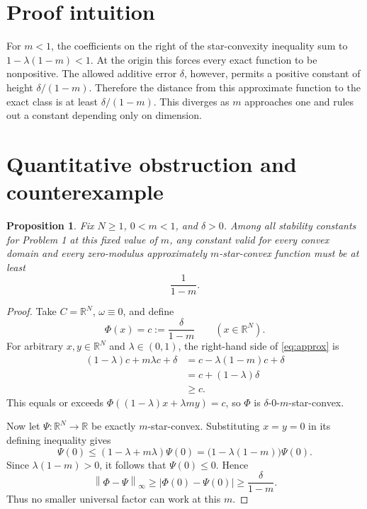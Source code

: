 \documentclass[11pt]{article}
\newcommand{\R}{\mathbb R}
\newcommand{\norm}[1]{\left\lVert#1\right\rVert}
\newtheorem{proposition}{Proposition}
\begin{document}
\section{Proof intuition}

For \(m<1\), the coefficients on the right of the star-convexity inequality
sum to \(1-\lambda(1-m)<1\).  At the origin this forces every exact function
to be nonpositive.  The allowed additive error \(\delta\), however, permits a
positive constant of height \(\delta/(1-m)\).  Therefore the distance from
this approximate function to the exact class is at least
\(\delta/(1-m)\).  This diverges as \(m\) approaches one and rules out a
constant depending only on dimension.

\section{Quantitative obstruction and counterexample}

\begin{proposition}\label{prop:fixedm}
Fix \(N\geq1\), \(0<m<1\), and \(\delta>0\).  Among all stability constants
for Problem 1 at this fixed value of \(m\), any constant valid for every
convex domain and every zero-modulus approximately \(m\)-star-convex function
must be at least
\[
 \frac{1}{1-m}.
\]
\end{proposition}

\begin{proof}
Take \(C=\R^N\), \(\omega\equiv0\), and define
\begin{equation}\label{eq:constant}
 \Phi(x)=c:=\frac{\delta}{1-m}\qquad(x\in\R^N).
\end{equation}
For arbitrary \(x,y\in\R^N\) and \(\lambda\in(0,1)\), the right-hand side
of \eqref{eq:approx} is
\begin{align*}
 (1-\lambda)c+m\lambda c+\delta
 &=c-\lambda(1-m)c+\delta\\
 &=c+(1-\lambda)\delta\\
 &\geq c.
\end{align*}
This equals or exceeds
\(\Phi((1-\lambda)x+\lambda m y)=c\), so \(\Phi\) is
\(\delta\)-\(0\)-\(m\)-star-convex.

Now let \(\Psi:\R^N\to\R\) be exactly \(m\)-star-convex.  Substituting
\(x=y=0\) in its defining inequality gives
\[
 \Psi(0)\leq(1-\lambda+m\lambda)\Psi(0)
 =\bigl(1-\lambda(1-m)\bigr)\Psi(0).
\]
Since \(\lambda(1-m)>0\), it follows that \(\Psi(0)\leq0\).  Hence
\begin{equation}\label{eq:distance}
 \norm{\Phi-\Psi}_\infty
 \geq |\Phi(0)-\Psi(0)|
 \geq\frac{\delta}{1-m}.
\end{equation}
Thus no smaller universal factor can work at this \(m\).
\end{proof}
\end{document}

